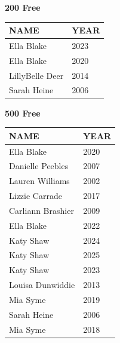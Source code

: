 \begin{table}[H]
\centering
\begin{minipage}[t]{0.48\textwidth}
\centering
\textbf{200 Free}\\[0.1cm]
\begin{tabular}{@{}p{2.8cm}p{1.2cm}@{}}
\hline
    \textbf{NAME} & \textbf{YEAR} \\
\hline
    Ella Blake & 2023 \\
    Ella Blake & 2020 \\
    LillyBelle Deer & 2014 \\
    Sarah Heine & 2006 \\
\hline
\end{tabular}
\end{minipage}\hfill
\begin{minipage}[t]{0.48\textwidth}
\centering
\textbf{500 Free}\\[0.1cm]
\begin{tabular}{@{}p{2.8cm}p{1.2cm}@{}}
\hline
    \textbf{NAME} & \textbf{YEAR} \\
\hline
    Ella Blake & 2020 \\
    Danielle Peebles & 2007 \\
    Lauren Williams & 2002 \\
    Lizzie Carrade & 2017 \\
    Carliann Brashier & 2009 \\
    Ella Blake & 2022 \\
    Katy Shaw & 2024 \\
    Katy Shaw & 2025 \\
    Katy Shaw & 2023 \\
    Louisa Dunwiddie & 2013 \\
    Mia Syme & 2019 \\
    Sarah Heine & 2006 \\
    Mia Syme & 2018 \\
\hline
\end{tabular}
\end{minipage}
\end{table}

